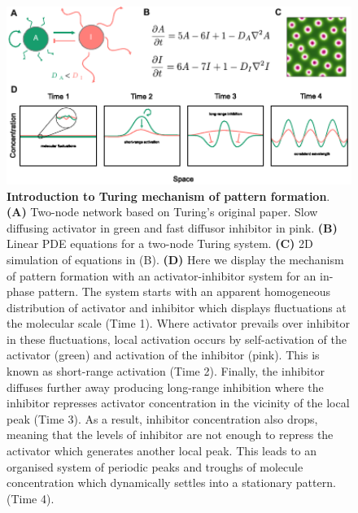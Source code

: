 \begin{figure}[h!]
    \centering
    \includegraphics[width=1\textwidth]{chapters/Introduction/intro_to_Turing_patterns}
    \caption{\textbf{Introduction to Turing mechanism of pattern formation}. \textbf{(A)} Two-node network based on Turing's original paper. Slow diffusing activator in green and fast diffusor inhibitor in pink. \textbf{(B)} Linear PDE equations for a two-node Turing system. \textbf{(C)} 2D simulation of equations in (B). \textbf{(D)} Here we display the mechanism of pattern formation with an activator-inhibitor system for an in-phase pattern. The system starts with an apparent homogeneous distribution of activator and inhibitor which displays fluctuations at the molecular scale (Time 1). Where activator prevails over inhibitor in these fluctuations, local activation occurs by self-activation of the activator (green) and activation of the inhibitor (pink). This is known as short-range activation (Time 2). Finally, the inhibitor diffuses further away producing long-range inhibition where the inhibitor represses activator concentration in the vicinity of the local peak (Time 3). As a result, inhibitor concentration also drops, meaning that the levels of inhibitor are not enough to repress the activator which generates another local peak. This leads to an organised system of periodic peaks and troughs of molecule concentration which dynamically settles into a stationary pattern. (Time 4). }
    \label{fig:intro_to_Turing_patterns}
\end{figure}



